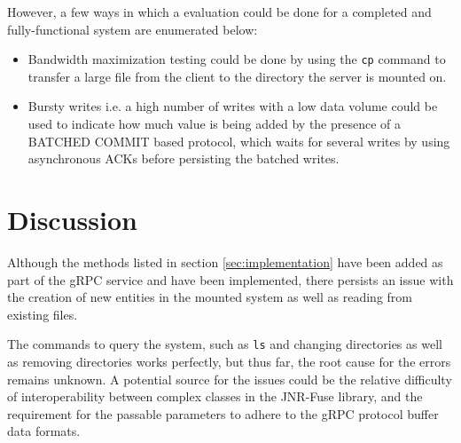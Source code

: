 \documentclass[a4paper]{article}
\begin{document}
However, a few ways in which a evaluation could be done for a completed and fully-functional system are enumerated below:
\begin{itemize}
    \item 
    Bandwidth maximization testing could be done by using the \texttt{cp} command to transfer a large file from the client to the directory the server is mounted on.
    \item 
    Bursty writes i.e. a high number of writes with a low data volume could be used to indicate how much value is being added by the presence of a BATCHED COMMIT based protocol, which waits for several writes by using asynchronous ACKs before persisting the batched writes.
\end{itemize}

\section{Discussion} \label{sec:discussion}
Although the methods listed in section \ref{sec:implementation} have been added as part of the gRPC service and have been implemented, there persists an issue with the creation of new entities in the mounted system as well as reading from existing files.

The commands to query the system, such as \texttt{ls} and changing directories as well as removing directories works perfectly, but thus far, the root cause for the errors remains unknown. A potential source for the issues could be the relative difficulty of interoperability between complex classes in the JNR-Fuse library, and the requirement for the passable parameters to adhere to the gRPC protocol buffer data formats.



\end{document}
